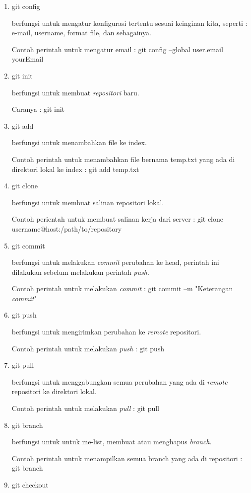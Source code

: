 \begin{enumerate}
    \item git config
    
    berfungsi untuk mengatur konfigurasi tertentu sesuai keinginan kita, seperti : e-mail, username, format file, dan sebagainya. 
    
    Contoh perintah untuk mengatur email : 
    git config --global user.email yourEmail
    
    \item git init
    
    berfungsi untuk membuat \textit{repositori} baru.
    
    Caranya : git init
    \item git add
    
    berfungsi untuk menambahkan file ke index.
    
    Contoh perintah untuk menambahkan file bernama temp.txt yang ada di direktori lokal ke index : git add temp.txt
    \item git clone 
    
    berfungsi untuk membuat salinan repositori lokal.
    
    Contoh perientah untuk membuat salinan kerja dari server : git clone username@host:/path/to/repository
    \item git commit
    
    berfungsi untuk melakukan \textit{commit} perubahan ke head, perintah ini dilakukan sebelum melakukan perintah \textit{push}.
    
    Contoh perintah untuk melakukan \textit{commit} : git commit –m "Keterangan \textit{commit}"
    \item git push
    
    berfungsi untuk mengirimkan perubahan ke \textit{remote} repositori.
    
    Contoh perintah untuk melakukan \textit{push} : git push
    \item git pull
    
    berfungsi untuk menggabungkan semua perubahan yang ada di \textit{remote} repositori ke direktori lokal.
    
    Contoh perintah untuk melakukan \textit{pull} : git pull
    \item git branch
    
    berfungsi untuk untuk me-list, membuat atau menghapus \textit{branch}.
    
    Contoh perintah untuk menampilkan semua branch yang ada di repositori : git branch
    \item git checkout
    

\end{enumerate}
